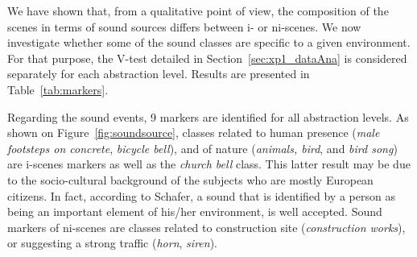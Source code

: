 \documentclass[12pt]{elsarticle}
\newcommand{\cf}{cf.}
\begin{document}

We have shown that, from a qualitative point of view, the composition of the scenes in terms of sound sources differs between i- or ni-scenes. We now investigate whether some of the sound classes are specific to a given environment. For that purpose, the V-test detailed in  Section~\ref{sec:xp1_dataAna} is considered separately for each abstraction level. Results are presented in Table~\ref{tab:markers}.


Regarding the sound events, 9 markers are identified for all abstraction levels. As shown on Figure~\ref{fig:soundsource}, classes related to human presence (\emph{male footsteps on concrete}, \emph{bicycle bell}), and of nature (\emph{animals, bird}, and \emph{bird song}) are i-scenes markers as well as the \emph{church bell} class. This latter result may be due to the socio-cultural background of the subjects who are mostly European citizens. In fact, according to Schafer, a sound that is identified by a person as being an important element of his/her environment, is well accepted. Sound markers of ni-scenes are classes related to construction site (\emph{construction works}), or suggesting a strong traffic (\emph{horn}, \emph{siren}).
\end{document}
